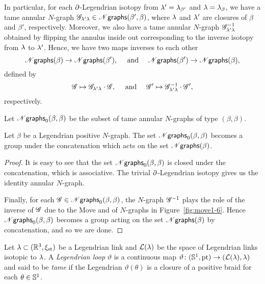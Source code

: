 In particular, for each $\partial$-Legendrian isotopy from $\lambda'=\lambda_{\beta'}$ and $\lambda=\lambda_\beta$, we have a tame annular $N$-graph $\mathscr{G}_{\lambda'\lambda}\in\mathscr{N}\mathsf{graphs}(\beta',\beta)$, where $\lambda$ and $\lambda'$ are closures of $\beta$ and $\beta'$, respectively.
Moreover, we also have a tame annular $N$-graph $\mathscr{G}^{-1}_{\lambda'\lambda}$ obtained by flipping the annulus inside out corresponding to the inverse isotopy from $\lambda$ to $\lambda'$.
Hence, we have two maps inverses to each other
\[
\mathscr{N}\mathsf{graphs}(\beta) \to \mathscr{N}\mathsf{graphs}(\beta'),\quad\text{ and }\quad
\mathscr{N}\mathsf{graphs}(\beta')\to \mathscr{N}\mathsf{graphs}(\beta),
\]
defined by
\[
\mathscr{G}\mapsto \mathscr{G}_{\lambda'\lambda}\cdot\mathscr{G},\quad\text{ and }\quad
\mathscr{G}'\mapsto \mathscr{G}^{-1}_{\lambda'\lambda}\cdot\mathscr{G}',
\]
respectively.

Let $\mathscr{N}\mathsf{graphs}_0(\beta,\beta)$ be the subset of tame annular $N$-graphs of type $(\beta,\beta)$.
\begin{lemma}
Let $\beta$ be a Legendrian positive $N$-graph.
The set $\mathscr{N}\mathsf{graphs}_0(\beta,\beta)$ becomes a group under the concatenation which acts on the set $\mathscr{N}\mathsf{graphs}(\beta)$.
\end{lemma}
\begin{proof}
It is easy to see that the set $\mathscr{N}\mathsf{graphs}_0(\beta,\beta)$ is closed under the concatenation, which is associative.
The trivial $\partial$-Legendrian isotopy gives us the identity annular $N$-graph.

Finally, for each $\mathscr{G}\in\mathscr{N}\mathsf{graphs}_0(\beta,\beta)$, the $N$-graph $\mathscr{G}^{-1}$ plays the role of the inverse of $\mathscr{G}$ due to the Move  and  of $N$-graphs in Figure~\ref{fig:move1-6}.
Hence $\mathscr{N}\mathsf{graphs}_0(\beta,\beta)$ becomes a group acting on the set $\mathscr{N}\mathsf{graphs}(\beta)$ by concatenation, and so we are done.
\end{proof}



\begin{definition}\label{definition:Legendrian loops}
Let $\lambda \subset (\mathbb{R} ^3, \xi_{\rm st})$ be a Legendrian link and $\mathcal{L}(\lambda)$ be the space of Legendrian links isotopic to $\lambda$. 
A {\em Legendrian loop} $\vartheta$ is a continuous map $\vartheta\colon(\mathbb{S}^1,{\rm pt})\to (\mathcal{L}(\lambda), \lambda)$ and said to be \emph{tame} if the Legendrian $\vartheta(\theta)$ is a closure of a positive braid for each $\theta\in\mathbb{S}^1$.
\end{definition}

